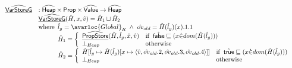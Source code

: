 \[\begin{array}{ll}
\ahf{VarStoreG} & : \aHeap \times \SF{Prop} \times \aValue \rightarrow \aHeap \\
& \ahf{VarStoreG}(\hat{H}, x, \hat{v})
  =
  \hat{H}_1 \sqcup \hat{H}_2 \\
&\wherec{
  \hat{l}_g = \avarloc{Global}_R\ \land\ \hat{ov}_{old} = \hat{H}(\hat{l}_g)(x).1.1\\
  \hat{H}_1 =
  \left\{
    \begin{array}{ll}
      \ahf{PropStore}(\hat{H},\hat{l}_g,\hat{x},\hat{v}) & \ifc{\afalse\sqsubseteq(x \dot{\in} dom(\hat{H}(\hat{l}_g)))} \\
      \bot_{Heap} & \owc \\
    \end{array}
   \right.\\ 
  \hat{H}_2 =
  \left\{
    \begin{array}{ll}
      \hat{H}[\hat{l}_g\mapsto \hat{H}(\hat{l}_g)[x \mapsto
        \langle \hat{v},\hat{ov}_{old}.2,\hat{ov}_{old}.3,\hat{ov}_{old}.4\rangle]]
        & \ifc{
          \atrue\sqsubseteq (x \dot{\in} dom(\hat{H}(\hat{l}_g)))\\
        } \\
        \bot_{Heap} & \owc \\
    \end{array}
  \right. \\
}\\\\


\end{array}\]
